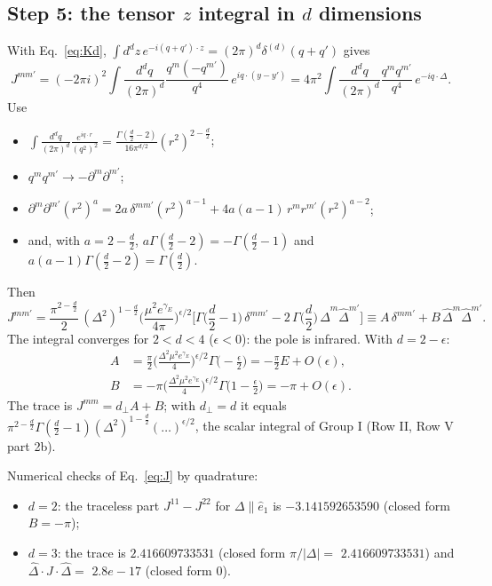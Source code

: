 \documentclass[10pt]{article}
\numberwithin{equation}{section}
\newcommand{\Dh}{\hat\Delta}
\begin{document}
\subsection{Step 5: the tensor \texorpdfstring{$z$}{z} integral in \texorpdfstring{$d$}{d} dimensions}\label{sec:J}
With Eq.~\eqref{eq:Kd}, $\int d^dz\,e^{-i(q+q')\cdot z}=(2\pi)^d\delta^{(d)}(q+q')$ gives
\begin{equation}
J^{mm'}=(-2\pi i)^2\int\frac{d^dq}{(2\pi)^d}\frac{q^m(-q^{m'})}{q^4}\,e^{iq\cdot(y-y')}=4\pi^2\int\frac{d^dq}{(2\pi)^d}\frac{q^mq^{m'}}{q^4}\,e^{-iq\cdot\Delta}.
\end{equation}
Use
\begin{itemize}
\item $\int\frac{d^dq}{(2\pi)^d}\frac{e^{iq\cdot r}}{(q^2)^2}=\frac{\Gamma(\frac d2-2)}{16\pi^{d/2}}(r^2)^{2-\frac d2}$;
\item $q^mq^{m'}\to-\partial^m\partial^{m'}$;
\item $\partial^m\partial^{m'}(r^2)^a=2a\,\delta^{mm'}(r^2)^{a-1}+4a(a-1)\,r^mr^{m'}(r^2)^{a-2}$;
\item and, with $a=2-\frac d2$, $a\Gamma(\frac d2-2)=-\Gamma(\frac d2-1)$ and $a(a-1)\Gamma(\frac d2-2)=\Gamma(\frac d2)$.
\end{itemize}
Then
\begin{equation}
J^{mm'}=\frac{\pi^{2-\frac d2}}{2}\,(\Delta^2)^{1-\frac d2}\Big(\frac{\mu^2e^{\gamma_E}}{4\pi}\Big)^{\epsilon/2}\Big[\Gamma\Big(\frac d2-1\Big)\,\delta^{mm'}-2\,\Gamma\Big(\frac d2\Big)\,\Dh^m\Dh^{m'}\Big]\equiv A\,\delta^{mm'}+B\,\Dh^m\Dh^{m'}.
\label{eq:J}
\end{equation}
The integral converges for $2<d<4$ ($\epsilon<0$): the pole is infrared. With $d=2-\epsilon$:
\begin{align}
A&=\frac{\pi}{2}\Big(\frac{\Delta^2\mu^2e^{\gamma_E}}{4}\Big)^{\epsilon/2}\Gamma\Big(-\frac\epsilon2\Big)=-\frac{\pi}{2}E+O(\epsilon),\\
B&=-\pi\Big(\frac{\Delta^2\mu^2e^{\gamma_E}}{4}\Big)^{\epsilon/2}\Gamma\Big(1-\frac\epsilon2\Big)=-\pi+O(\epsilon).
\end{align}
The trace is $J^{mm}=d_\perp A+B$; with $d_\perp=d$ it equals $\pi^{2-\frac d2}\Gamma(\frac d2-1)(\Delta^2)^{1-\frac d2}(\dots)^{\epsilon/2}$, the scalar integral of Group I (Row II, Row V part 2b).

Numerical checks of Eq.~\eqref{eq:J} by quadrature:
\begin{itemize}
\item $d=2$: the traceless part $J^{11}-J^{22}$ for $\Delta\parallel\hat e_1$ is $-3.141592653590$ (closed form $B=-\pi$);
\item $d=3$: the trace is $2.416609733531$ (closed form $\pi/|\Delta|=$ $2.416609733531$) and $\Dh\cdot J\cdot\Dh=$ $2.8e-17$ (closed form $0$).
\end{itemize}
\end{document}
